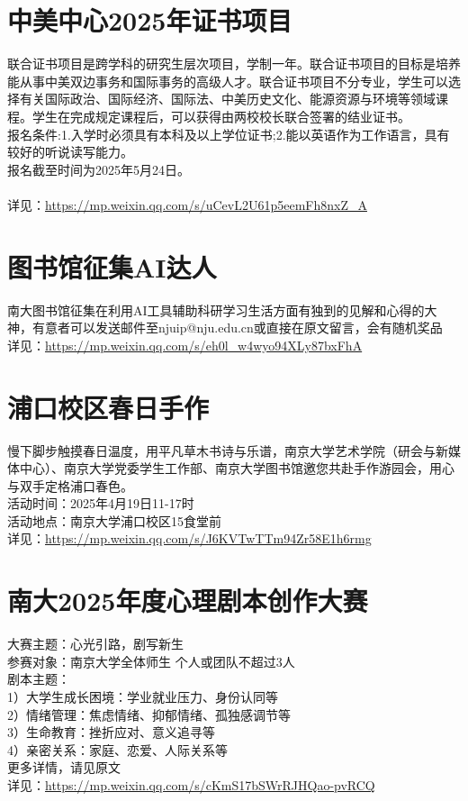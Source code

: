 \documentclass[letterpaper, 12pt]{article}
\begin{document}
\begin{multicols}{2}
\section{中美中心2025年证书项目}
联合证书项目是跨学科的研究生层次项目，学制一年。联合证书项目的目标是培养能从事中美双边事务和国际事务的高级人才。联合证书项目不分专业，学生可以选择有关国际政治、国际经济、国际法、中美历史文化、能源资源与环境等领域课程。学生在完成规定课程后，可以获得由两校校长联合签署的结业证书。
\\报名条件:1.入学时必须具有本科及以上学位证书;2.能以英语作为工作语言，具有较好的听说读写能力。
\\报名截至时间为2025年5月24日。
\\
\\详见：\url{https://mp.weixin.qq.com/s/uCevL2U61p5eemFh8nxZ_A}
\section{图书馆征集AI达人}
南大图书馆征集在利用AI工具辅助科研学习生活方面有独到的见解和心得的大神，有意者可以发送邮件至njuip@nju.edu.cn或直接在原文留言，会有随机奖品
\\详见：\url{https://mp.weixin.qq.com/s/eh0l_w4wyo94XLy87bxFhA}

\section{浦口校区春日手作}
慢下脚步触摸春日温度，用平凡草木书诗与乐谱，南京大学艺术学院（研会与新媒体中心）、南京大学党委学生工作部、南京大学图书馆邀您共赴手作游园会，用心与双手定格浦口春色。
\\活动时间：2025年4月19日11-17时
\\活动地点：南京大学浦口校区15食堂前
\\详见：\url{https://mp.weixin.qq.com/s/J6KVTwTTm94Zr58E1h6rmg}


\section{南大2025年度心理剧本创作大赛}
大赛主题：心光引路，剧写新生
\\参赛对象：南京大学全体师生 个人或团队不超过3人
\\剧本主题：
\\1）大学生成长困境：学业就业压力、身份认同等
\\2）情绪管理：焦虑情绪、抑郁情绪、孤独感调节等
\\3）生命教育：挫折应对、意义追寻等
\\4）亲密关系：家庭、恋爱、人际关系等
\\更多详情，请见原文
\\详见：\url{https://mp.weixin.qq.com/s/cKmS17bSWrRJHQao-pvRCQ}


\end{multicols}
\end{document}

